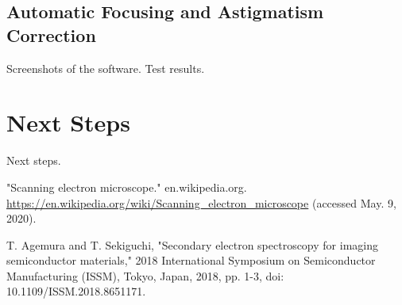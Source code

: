 \documentclass{article}
\begin{document}
\subsection{Automatic Focusing and Astigmatism Correction}
Screenshots of the software.
Test results.

\section{Next Steps}
Next steps.

\newpage
\begin{thebibliography}{}
    "Scanning electron microscope." en.wikipedia.org. \url{https://en.wikipedia.org/wiki/Scanning_electron_microscope} (accessed May. 9, 2020).

    T. Agemura and T. Sekiguchi, "Secondary electron spectroscopy for imaging semiconductor materials," 2018 International Symposium on Semiconductor Manufacturing (ISSM), Tokyo, Japan, 2018, pp. 1-3, doi: 10.1109/ISSM.2018.8651171.
\end{thebibliography}
\end{document}
